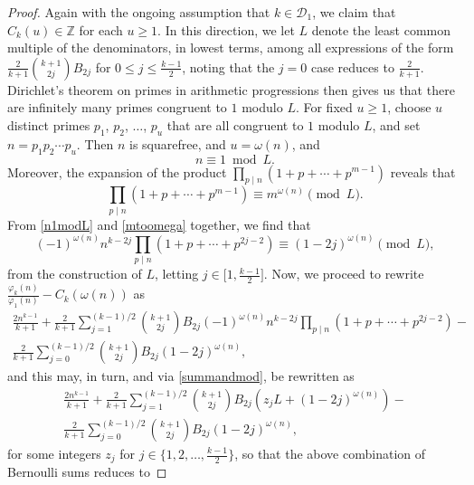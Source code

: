 \documentclass[12pt]{article}
\begin{document}
\begin{proof}
 Again with the ongoing assumption that $k \in \mathcal{D}_{1}$, we claim that $C_{k}(u) \in \mathbb{Z}$ for each $u \geq 1$. In this 
 direction, we let $L$ denote the least common multiple of the denominators, in lowest terms, among all expressions of the form 
 $\frac{2}{k+1} \binom{k+1}{2j} B_{2j}$ for $0 \leq j \leq \frac{k-1}{2}$, noting that the $j=0$ case reduces to $\frac{2}{k+1}$. Dirichlet's 
 theorem on primes in arithmetic progressions then gives us that 
 there are infinitely many primes congruent to $1$ modulo $L$. 
 For fixed $u \geq 1$, choose $u$ distinct primes $p_1$, $p_2$, $\ldots$, $p_u$
 that are all congruent to $1$ modulo $L$, 
 and set $n = p_1 p_2 \cdots p_u$. 
 Then $n$ is squarefree, and $u = \omega(n)$, and 
\begin{equation}\label{n1modL}
 n \equiv 1 \bmod L. 
\end{equation}
 Moreover, the expansion of the product 
 $\prod_{p \mid n} (1 + p + \cdots + p^{m-1}) $ reveals that 
\begin{equation}\label{mtoomega}
 \prod_{p \mid n} (1 + p + \cdots + p^{m-1}) \equiv m^{\omega(n)} \pmod L. 
\end{equation}
 From \eqref{n1modL} and \eqref{mtoomega} together, we find that 
\begin{equation}\label{summandmod}
 (-1)^{\omega(n)} n^{k-2j} \prod_{p \mid n} (1 + p + \cdots + p^{2j-2}) \equiv (1-2j)^{\omega(n)} \pmod L, 
\end{equation} 
 from the construction of $L$, letting $ j \in \big[1, \frac{k-1}{2} \big]$. Now, we proceed to rewrite $ \frac{ \varphi_k(n) }{ \varphi_1(n) } 
 - C_k(\omega(n))$ as 
\begin{multline*}
 \frac{2n^{k-1}}{k+1} + \frac{2 }{k+1} \sum_{j=1}^{(k-1)/2} \binom{k+1}{2j} B_{2j} (-1)^{\omega(n)} n^{k-2j} 
 \prod_{p \mid n} (1 + p + \cdots + p^{2j-2}) - \\ 
 \frac{2}{k+1} \sum_{j=0}^{(k-1)/2} \binom{k+1}{2j} B_{2j} (1 - 2 j)^{\omega(n)}, 
\end{multline*}
 and this may, in turn, and via \eqref{summandmod}, be rewritten as 
\begin{multline*}
 \frac{2n^{k-1}}{k+1} + \frac{2 }{k+1}
 \sum_{j=1}^{(k-1)/2} \binom{k+1}{2j} B_{2j} (z_j L + (1- 2 j)^{\omega(n)}) - \\ 
 \frac{2}{k+1} \sum_{j=0}^{(k-1)/2} \binom{k+1}{2j} B_{2j} (1 - 2 j)^{\omega(n)}, 
\end{multline*}
 for some integers $z_j$ for $j \in \big\{ 1, 2, \ldots, \frac{k-1}{2} \big\}$, so that the above combination of Bernoulli sums reduces to 

\end{proof}
\end{document}
